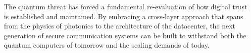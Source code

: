 The quantum threat has forced a fundamental re-evaluation of how digital trust is established and maintained. By embracing a cross-layer approach that spans from the physics of photonics to the architecture of the datacenter, the next generation of secure communication systems can be built to withstand both the quantum computers of tomorrow and the scaling demands of today.
